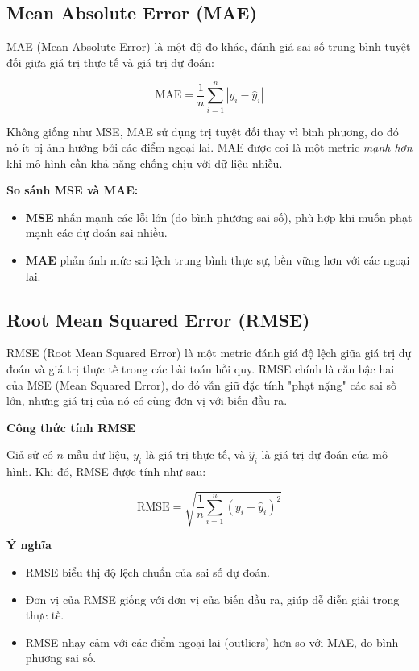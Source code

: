 \subsection {Mean Absolute Error (MAE)}
\label{eval:mae}
MAE (Mean Absolute Error) là một độ đo khác, đánh giá sai số trung bình tuyệt đối giữa giá trị thực tế và giá trị dự đoán:

\begin{equation}
\text{MAE} = \frac{1}{n} \sum_{i=1}^{n} |y_i - \hat{y}_i|
\end{equation}

Không giống như MSE, MAE sử dụng trị tuyệt đối thay vì bình phương, do đó nó ít bị ảnh hưởng bởi các điểm ngoại lai. MAE được coi là một metric \textit{mạnh hơn} khi mô hình cần khả năng chống chịu với dữ liệu nhiễu.

\vspace{0.3cm}
\noindent\textbf{So sánh MSE và MAE:}
\begin{itemize}
    \item \textbf{MSE} nhấn mạnh các lỗi lớn (do bình phương sai số), phù hợp khi muốn phạt mạnh các dự đoán sai nhiều.
    \item \textbf{MAE} phản ánh mức sai lệch trung bình thực sự, bền vững hơn với các ngoại lai.
\end{itemize}

\subsection {Root Mean Squared Error (RMSE)}
\label{eval:rmse}
RMSE (Root Mean Squared Error) là một metric đánh giá độ lệch giữa giá trị dự đoán và giá trị thực tế trong các bài toán hồi quy. RMSE chính là căn bậc hai của MSE (Mean Squared Error), do đó vẫn giữ đặc tính "phạt nặng" các sai số lớn, nhưng giá trị của nó có cùng đơn vị với biến đầu ra.

\textbf{Công thức tính RMSE}

Giả sử có $n$ mẫu dữ liệu, $y_i$ là giá trị thực tế, và $\hat{y}_i$ là giá trị dự đoán của mô hình. Khi đó, RMSE được tính như sau:

\begin{equation}
\text{RMSE} = \sqrt{ \frac{1}{n} \sum_{i=1}^{n} (y_i - \hat{y}_i)^2 }
\end{equation}

\textbf{Ý nghĩa}

\begin{itemize}
    \item RMSE biểu thị độ lệch chuẩn của sai số dự đoán.
    \item Đơn vị của RMSE giống với đơn vị của biến đầu ra, giúp dễ diễn giải trong thực tế.
    \item RMSE nhạy cảm với các điểm ngoại lai (outliers) hơn so với MAE, do bình phương sai số.
\end{itemize}

